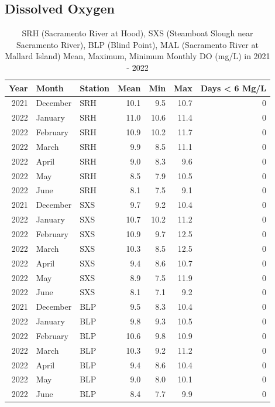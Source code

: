 \documentclass[
]{book}
\theoremstyle{definition}
\theoremstyle{definition}
\theoremstyle{definition}
\theoremstyle{definition}
\theoremstyle{remark}
\begin{document}
\hypertarget{dissolved-oxygen-2}{%
\subsection{Dissolved Oxygen}\label{dissolved-oxygen-2}}

\begin{table}
\centering
\caption{SRH (Sacramento River at Hood), SXS (Steamboat Slough near Sacramento River), BLP (Blind Point), MAL (Sacramento River at Mallard Island) Mean, Maximum, Minimum Monthly DO (mg/L) in 2021 - 2022}
\centering
\begin{tabular}[t]{rllrrrr}
\hline
Year & Month & Station & Mean & Min & Max & Days < 6 Mg/L\\
\hline
2021 & December & SRH & 10.1 & 9.5 & 10.7 & 0\\
\hline
2022 & January & SRH & 11.0 & 10.6 & 11.4 & 0\\
\hline
2022 & February & SRH & 10.9 & 10.2 & 11.7 & 0\\
\hline
2022 & March & SRH & 9.9 & 8.5 & 11.1 & 0\\
\hline
2022 & April & SRH & 9.0 & 8.3 & 9.6 & 0\\
\hline
2022 & May & SRH & 8.5 & 7.9 & 10.5 & 0\\
\hline
2022 & June & SRH & 8.1 & 7.5 & 9.1 & 0\\
\hline
2021 & December & SXS & 9.7 & 9.2 & 10.4 & 0\\
\hline
2022 & January & SXS & 10.7 & 10.2 & 11.2 & 0\\
\hline
2022 & February & SXS & 10.9 & 9.7 & 12.5 & 0\\
\hline
2022 & March & SXS & 10.3 & 8.5 & 12.5 & 0\\
\hline
2022 & April & SXS & 9.4 & 8.6 & 10.7 & 0\\
\hline
2022 & May & SXS & 8.9 & 7.5 & 11.9 & 0\\
\hline
2022 & June & SXS & 8.1 & 7.1 & 9.2 & 0\\
\hline
2021 & December & BLP & 9.5 & 8.3 & 10.4 & 0\\
\hline
2022 & January & BLP & 9.8 & 9.3 & 10.5 & 0\\
\hline
2022 & February & BLP & 10.6 & 9.8 & 10.9 & 0\\
\hline
2022 & March & BLP & 10.3 & 9.2 & 11.2 & 0\\
\hline
2022 & April & BLP & 9.4 & 8.6 & 10.4 & 0\\
\hline
2022 & May & BLP & 9.0 & 8.0 & 10.1 & 0\\
\hline
2022 & June & BLP & 8.4 & 7.7 & 9.9 & 0\\

\end{tabular}
\end{table}
\end{document}
